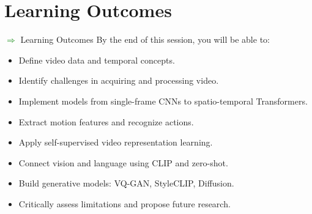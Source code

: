 \section{Learning Outcomes}
\begin{frame}[allowframebreaks]{\textcolor{green}{$\Rightarrow$} Learning Outcomes}
    By the end of this session, you will be able to:
    \begin{itemize}
        \item Define video data and temporal concepts.
        \item Identify challenges in acquiring and processing video.
        \item Implement models from single-frame CNNs to spatio-temporal Transformers.
        \item Extract motion features and recognize actions.
        \item Apply self-supervised video representation learning.
        \item Connect vision and language using CLIP and zero-shot.
        \item Build generative models: VQ-GAN, StyleCLIP, Diffusion.
        \item Critically assess limitations and propose future research.
    \end{itemize}
\end{frame}